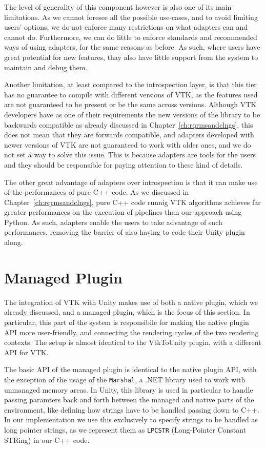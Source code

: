 The level of generality of this component however is also one of its main limitations. As we cannot foresee all the possible use-cases, and to avoid limiting users' options, we do not enforce many restrictions on what adapters can and cannot do. Furthermore, we can do little to enforce standards and recommended ways of using adapters, for the same reasons as before. As such, where users have great potential for new features, thay also have little support from the system to maintain and debug them.

Another limitation, at least compared to the introspection layer, is that this tier has no guarantee to compile with different versions of VTK, as the features used are not guaranteed to be present or be the same across versions. Although VTK developers have as one of their requirements the new versions of the library to be backwards compatible as already discussed in Chapter~\ref{ch:rqrmsandclngs}, this does not mean that they are forwards compatible, and adapters developed with newer versions of VTK are not guaranteed to work with older ones, and we do not set a way to solve this issue. This is because adapters are tools for the users and they should be responsible for paying attention to these kind of details.

The other great advantage of adapters over introspection is that it can make use of the performances of pure C++ code. As we discussed in Chapter~\ref{ch:rqrmsandclngs}, pure C++ code runnig VTK algorithms achieves far greater performances on the execution of pipelines than our approach using Python. As such, adapters enable the users to take advantage of such performances, removing the barrier of also having to code their Unity plugin along.

\section{Managed Plugin}
\label{sec:design-managed-plugin}

The integration of VTK with Unity makes use of both a native plugin, which we already discussed, and a managed plugin, which is the focus of this section. In particular, this part of the system is responsibile for making the native plugin API more user-friendly, and connecting the rendering cycles of the two rendering contexts. The setup is almost identical to the VtkToUnity plugin, with a different API for VTK.

The basic API of the managed plugin is identical to the native plugin API, with the exception of the usage of the \verb|Marshal|, a .NET library used to work with unmanaged memory areas. In Unity, this library is used in particular to handle passing paramters back and forth between the managed and native parts of the environment, like defining how strings have to be handled passing down to C++. In our implementation we use this exclusively to specify strings to be handled as long pointer strings, as we represent them as \verb|LPCSTR| (Long-Pointer Constant STRing) in our C++ code.

